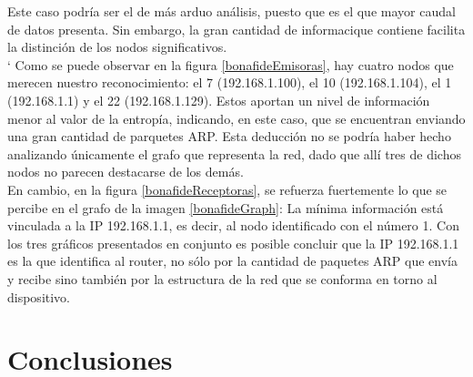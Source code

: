 Este caso podr\'ia ser el de m\'as arduo an\'alisis, puesto que es el que mayor caudal de datos presenta. Sin embargo, la gran cantidad de informaci que contiene facilita la distinci\'on de los nodos significativos. \\`
Como se puede observar en la figura \ref{bonafideEmisoras}, hay cuatro nodos que merecen nuestro reconocimiento: el 7 (192.168.1.100), el 10 (192.168.1.104), el 1 (192.168.1.1) y el 22 (192.168.1.129). Estos aportan un nivel de informaci\'on menor al valor de la entrop\'ia, indicando, en este caso, que se encuentran enviando una gran cantidad de parquetes ARP. Esta deducci\'on no se podr\'ia haber hecho analizando \'unicamente el grafo que representa la red, dado que all\'i tres de dichos nodos no parecen destacarse de los dem\'as.\\

En cambio, en la figura \ref{bonafideReceptoras}, se refuerza fuertemente lo que se percibe en el grafo de la imagen \ref{bonafideGraph}: La mínima informaci\'on est\'a vinculada a la IP 192.168.1.1, es decir, al nodo identificado con el n\'umero 1. Con los tres gr\'aficos presentados en conjunto es posible concluir que la IP 192.168.1.1 es la que identifica al router, no s\'olo por la cantidad de paquetes ARP que env\'ia y recibe sino tambi\'en por la estructura de la red que se conforma en torno al dispositivo.


\section{Conclusiones}

